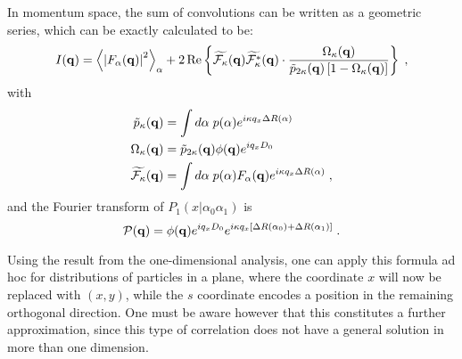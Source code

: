 In momentum space, the sum of convolutions can be written as a geometric series, which can be exactly calculated to be:
\begin{equation}
\label{eq:sscainf}
  I(\mathbf{q} ) = \left\langle \left| F_\alpha(\mathbf{q} ) \right| ^2 \right\rangle_{\alpha}  + 2 \operatorname{Re} \left\lbrace \widetilde{\mathcal{F}_\kappa}(\mathbf{q} )\widetilde{\mathcal{F}_\kappa^*}(\mathbf{q} ) \cdot \frac{\Omega_\kappa(\mathbf{q} )}{\tilde{p}_{2\kappa}(\mathbf{q} )\left[ 1 - \Omega_\kappa(\mathbf{q} )\right] } \right\rbrace \; ,
\end{equation}
with
\begin{align*}
  \tilde{p}_\kappa(\mathbf{q} ) &= \int d\alpha\; p(\alpha) e^{i\kappa q_x \Delta R(\alpha)}  \\
  \Omega_\kappa(\mathbf{q} ) &= \tilde{p}_{2\kappa}(\mathbf{q} ) \phi(\mathbf{q}) e^{i q_x D_0}  \\
  \widetilde{\mathcal{F}_\kappa}(\mathbf{q} ) &= \int d\alpha\; p(\alpha)F_\alpha (\mathbf{q} ) e^{i\kappa q_x \Delta R(\alpha)} \; ,
\end{align*}
and the Fourier transform of $P_1(x|\alpha_0\alpha_1)$ is
\begin{equation*}
  \mathcal{P} (\mathbf{q} ) = \phi (\mathbf{q} )e^{i q_x D_0} e^{i \kappa q_x \left[ \Delta R(\alpha_0) + \Delta R(\alpha_1) \right] } \; .
\end{equation*}

Using the result from the one-dimensional analysis, one can apply this formula ad hoc for distributions of particles in a plane, where the coordinate $x$ will now be replaced with $(x,y)$, while the $s$ coordinate encodes a position in the remaining orthogonal direction. One must be aware however that this constitutes a further approximation, since this type of correlation does not have a general solution in more than one dimension.

